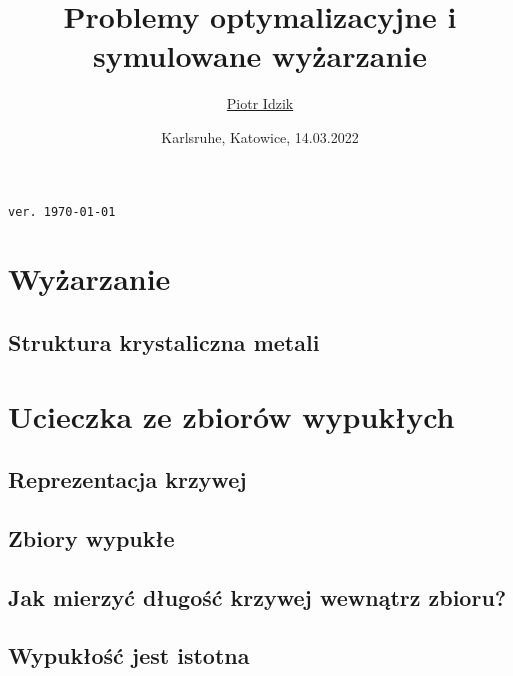 \documentclass[aspectratio=169]{beamer}
\author{\texorpdfstring{\href{\myLinkedinLink}{Piotr Idzik} \\ \email{\myEmail}}{Piotr Idzik}}
\title{Problemy optymalizacyjne i symulowane wyżarzanie}
\date{Karlsruhe, Katowice, 14.03.2022}
\newcommand{\myLinkedinLink}{https://www.linkedin.com/in/piotr-idzik-34b572151/}
\newcommand{\myGithubLink}{https://github.com/vil02/}
\newcommand{\myLinkedin}{\href{\myLinkedinLink}{\faLinkedinSquare}}
\newcommand{\myGithub}{\href{\myGithubLink}{\faGithubSquare}}
\begin{document}
\begin{frame}[plain]
\maketitle

\myLinkedin{}
\myGithub{}
\hfill \textcolor[rgb]{0.85,0.85,0.85}{\texttt{\tiny{ver. \today\ \currenttime\/}}}
\end{frame}

\section{Wyżarzanie}
\subsection{Struktura krystaliczna metali}
{\crystalsExamplesTex}

\section{Ucieczka ze zbiorów wypukłych}
\subsection{Reprezentacja krzywej}
{\curveRepresentationExampleTex}
\subsection{Zbiory wypukłe}
{\convexExamplesTex}
\subsection{Jak mierzyć długość krzywej wewnątrz zbioru?}
{\lengthInsideExampleTex}
\subsection{Wypukłość jest istotna}
{\lengthInsideExampleNonconvexTex}
\end{document}

